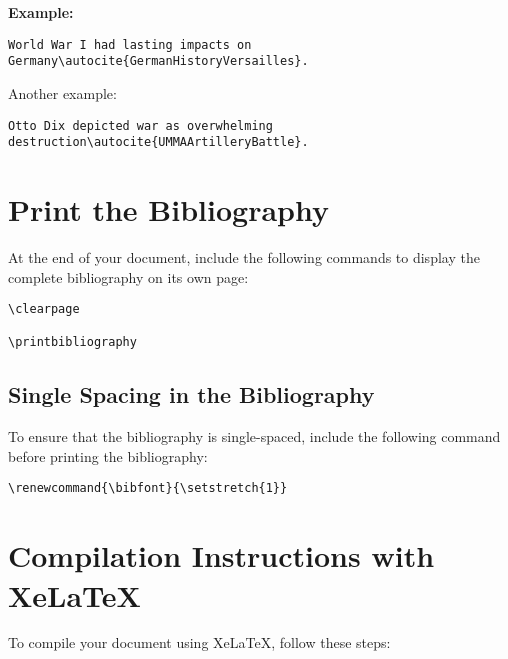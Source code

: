 \documentclass{article}
\begin{document}
\textbf{Example:}

\begin{lstlisting}
World War I had lasting impacts on Germany\autocite{GermanHistoryVersailles}.
\end{lstlisting}

Another example:

\begin{lstlisting}
Otto Dix depicted war as overwhelming destruction\autocite{UMMAArtilleryBattle}.
\end{lstlisting}

\vspace{1em}

\section{Print the Bibliography}

At the end of your document, include the following commands to display the complete bibliography on its own page:

\begin{lstlisting}
\clearpage

\printbibliography
\end{lstlisting}

\vspace{1em}

\subsection{Single Spacing in the Bibliography}

To ensure that the bibliography is single-spaced, include the following command before printing the bibliography:

\begin{lstlisting}
\renewcommand{\bibfont}{\setstretch{1}}
\end{lstlisting}

\vspace{1em}

\section{Compilation Instructions with XeLaTeX}

To compile your document using XeLaTeX, follow these steps:
\end{document}
